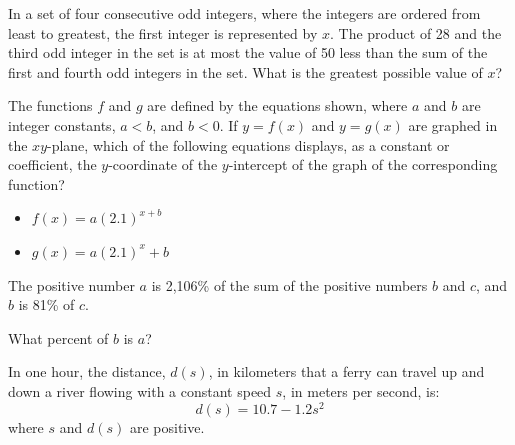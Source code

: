 \vspace{2em}

\noindent\markforreview
\vspace{1em}

In a set of four consecutive odd integers, where the integers are ordered from least to greatest, the first integer is represented by $x$. The product of 28 and the third odd integer in the set is at most the value of 50 less than the sum of the first and fourth odd integers in the set. What is the greatest possible value of $x$?


\vspace{2em}

\newpage
\vspace{2em}
\noindent\markforreview
\vspace{1em}

The functions \(f\) and \(g\) are defined by the equations shown, where \(a\) and \(b\) are integer constants, \(a < b\), and \(b < 0\). If \(y = f(x)\) and \(y = g(x)\) are graphed in the \(xy\)-plane, which of the following equations displays, as a constant or coefficient, the \(y\)-coordinate of the \(y\)-intercept of the graph of the corresponding function?

\begin{itemize}
    \item[I.] \(f(x) = a(2.1)^{x + b}\)
    \item[II.] \(g(x) = a(2.1)^x + b\)
\end{itemize}


\vspace{2em}

\noindent\markforreview
\vspace{1em}

The positive number \(a\) is 2,106\% of the sum of the positive numbers \(b\) and \(c\),  
and \(b\) is 81\% of \(c\).  

What percent of \(b\) is \(a\)?


\newpage
\noindent\markforreview
\vspace{1em}

In one hour, the distance, \(d(s)\), in kilometers that a ferry can travel up and down a river  
flowing with a constant speed \(s\), in meters per second, is:  
\[
d(s) = 10.7 - 1.2s^2
\]  
where \(s\) and \(d(s)\) are positive.  

